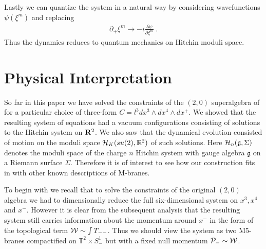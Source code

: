 \documentclass[12pt]{article}
\numberwithin{equation}{section}
\begin{document}
Lastly we can  quantize the system in a natural way by considering wavefunctions $\psi(\xi^m)$ and replacing 
\begin{align}
\partial_+ \xi^m\to -i\frac{\partial \psi}{\partial \xi^m}\ .
\end{align}
Thus the dynamics reduces to quantum mechanics on Hitchin moduli space.


\section{Physical Interpretation}

So far in this paper we have solved the constraints of the $(2,0)$ superalgebra of \cite{Lambert:2016xbs} for a particular choice of three-form $C=l^3 dx^3\wedge dx^4\wedge dx^+$. We showed that the resulting system of equations had a vacuum configurations consisting of solutions to the Hitchin system on ${\bf R}^2$. We also saw that  the dynamical evolution  consisted of motion on the moduli space ${\cal H}_K(su(2),{\mathbb R}^2)$ of such solutions. Here  ${\cal H}_n({\mathfrak g},\Sigma)$ denotes the moduli space of the charge $n$ Hitchin system with gauge algebra ${\mathfrak g}$ on a Riemann surface $\Sigma$.  Therefore it is of interest to see how our construction fits in with other known descriptions of M-branes.

To begin with we recall that to solve the constraints of the original $(2,0)$ algebra we had to dimensionally reduce the full six-dimensional system on $x^3,x^4$ and $x^-$. However it is clear from the subsequent analysis that the resulting system still carries information about the momentum around $x^-$ in the form of the topological term ${\cal W}\sim \int T_{--}$. Thus we should view the system as two  M5-branes compactified on ${\mathbb T}^2\times S^1_-$ but with a fixed null momentum ${\cal P}_-\sim {\cal W}$.  
\end{document}
